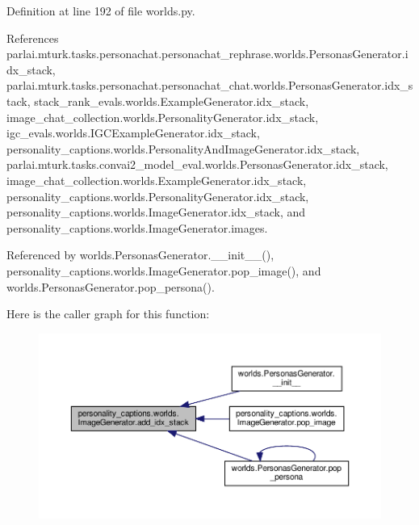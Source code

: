 Definition at line 192 of file worlds.\+py.



References parlai.\+mturk.\+tasks.\+personachat.\+personachat\+\_\+rephrase.\+worlds.\+Personas\+Generator.\+idx\+\_\+stack, parlai.\+mturk.\+tasks.\+personachat.\+personachat\+\_\+chat.\+worlds.\+Personas\+Generator.\+idx\+\_\+stack, stack\+\_\+rank\+\_\+evals.\+worlds.\+Example\+Generator.\+idx\+\_\+stack, image\+\_\+chat\+\_\+collection.\+worlds.\+Personality\+Generator.\+idx\+\_\+stack, igc\+\_\+evals.\+worlds.\+I\+G\+C\+Example\+Generator.\+idx\+\_\+stack, personality\+\_\+captions.\+worlds.\+Personality\+And\+Image\+Generator.\+idx\+\_\+stack, parlai.\+mturk.\+tasks.\+convai2\+\_\+model\+\_\+eval.\+worlds.\+Personas\+Generator.\+idx\+\_\+stack, image\+\_\+chat\+\_\+collection.\+worlds.\+Example\+Generator.\+idx\+\_\+stack, personality\+\_\+captions.\+worlds.\+Personality\+Generator.\+idx\+\_\+stack, personality\+\_\+captions.\+worlds.\+Image\+Generator.\+idx\+\_\+stack, and personality\+\_\+captions.\+worlds.\+Image\+Generator.\+images.



Referenced by worlds.\+Personas\+Generator.\+\_\+\+\_\+init\+\_\+\+\_\+(), personality\+\_\+captions.\+worlds.\+Image\+Generator.\+pop\+\_\+image(), and worlds.\+Personas\+Generator.\+pop\+\_\+persona().

Here is the caller graph for this function\+:
\nopagebreak
\begin{figure}[H]
\begin{center}
\leavevmode
\includegraphics[width=350pt]{classpersonality__captions_1_1worlds_1_1ImageGenerator_a4861d21c69ec7e05b958d948b55dbbec_icgraph}
\end{center}
\end{figure}
\mbox{\label{classpersonality__captions_1_1worlds_1_1ImageGenerator_a3ed9513ae59885f39f95a65d610b9b54}} 
